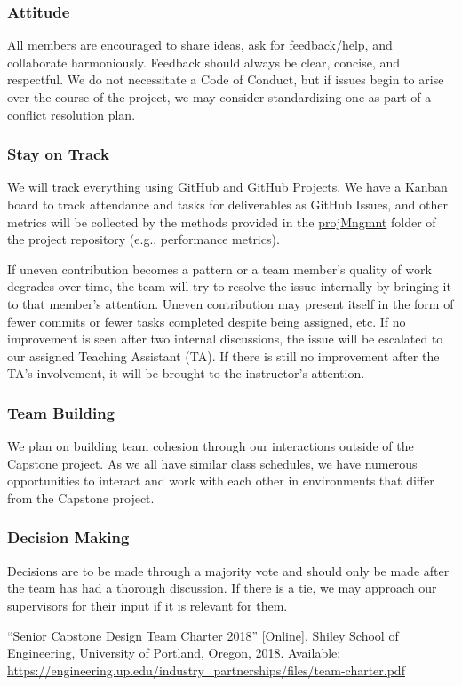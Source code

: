 \documentclass{article}
\begin{document}
\subsubsection*{Attitude}

All members are encouraged to share ideas, ask for feedback/help, and collaborate
harmoniously. Feedback should always be clear, concise, and respectful. We do not
necessitate a Code of Conduct, but if issues begin to arise over the course of the
project, we may consider standardizing one as part of a conflict resolution plan.

\subsubsection*{Stay on Track}

We will track everything using GitHub and GitHub Projects. We have a Kanban board to
track attendance and tasks for deliverables as GitHub Issues, and other
metrics will be collected by the methods provided in the \href{https://github.com/SumanyaG/Alkalytics/tree/main/docs/projMngmnt}{projMngmnt}
folder of the project repository (e.g., performance metrics).\newline

\noindent If uneven contribution becomes a pattern or a team member’s quality of work degrades
over time, the team will try to resolve the issue internally by bringing it to that
member’s attention. Uneven contribution may present itself in the form of fewer
commits or fewer tasks completed despite being assigned, etc. If no improvement is
seen after two internal discussions, the issue will be escalated to our assigned
Teaching Assistant (TA). If there is still no improvement after the TA's involvement,
it will be brought to the instructor's attention.

\subsubsection*{Team Building}

We plan on building team cohesion through our interactions outside of the Capstone
project. As we all have similar class schedules, we have numerous opportunities to
interact and work with each other in environments that differ from the Capstone
project. 

\subsubsection*{Decision Making} 

Decisions are to be made through a majority vote and should only be made after the
team has had a thorough discussion. If there is a tie, we may approach our
supervisors for their input if it is relevant for them.

\newpage{}

\begin{thebibliography}{1}
   ``Senior Capstone Design Team Charter 2018'' [Online], Shiley School of Engineering, University of Portland, Oregon, 2018. Available: \url{https://engineering.up.edu/industry_partnerships/files/team-charter.pdf}
\end{thebibliography}
\end{document}
